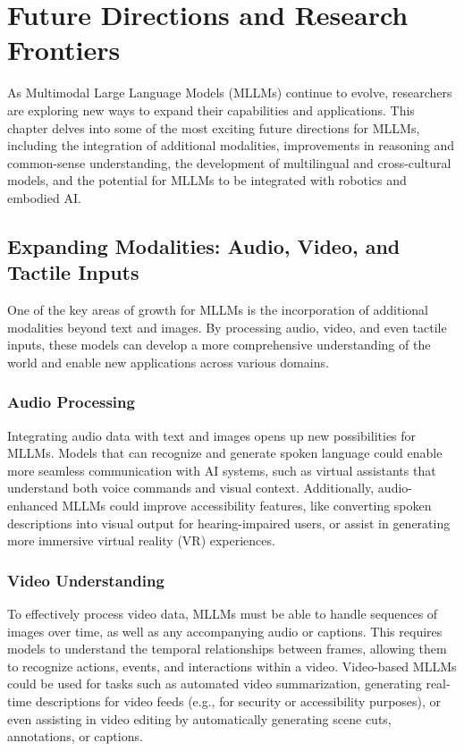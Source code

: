 \chapter{Future Directions and Research Frontiers}

As Multimodal Large Language Models (MLLMs) continue to evolve, researchers are exploring new ways to expand their capabilities and applications. This chapter delves into some of the most exciting future directions for MLLMs, including the integration of additional modalities, improvements in reasoning and common-sense understanding, the development of multilingual and cross-cultural models, and the potential for MLLMs to be integrated with robotics and embodied AI.

\section{Expanding Modalities: Audio, Video, and Tactile Inputs}

One of the key areas of growth for MLLMs is the incorporation of additional modalities beyond text and images. By processing audio, video, and even tactile inputs, these models can develop a more comprehensive understanding of the world and enable new applications across various domains.

\subsection{Audio Processing}

Integrating audio data with text and images opens up new possibilities for MLLMs. Models that can recognize and generate spoken language could enable more seamless communication with AI systems, such as virtual assistants that understand both voice commands and visual context. Additionally, audio-enhanced MLLMs could improve accessibility features, like converting spoken descriptions into visual output for hearing-impaired users, or assist in generating more immersive virtual reality (VR) experiences.

\subsection{Video Understanding}

To effectively process video data, MLLMs must be able to handle sequences of images over time, as well as any accompanying audio or captions. This requires models to understand the temporal relationships between frames, allowing them to recognize actions, events, and interactions within a video. Video-based MLLMs could be used for tasks such as automated video summarization, generating real-time descriptions for video feeds (e.g., for security or accessibility purposes), or even assisting in video editing by automatically generating scene cuts, annotations, or captions.

